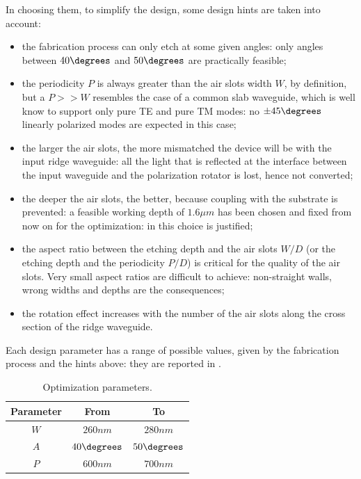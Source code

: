 In choosing them, to simplify the design, some design hints are taken
into account:
\begin{itemize}
\item
  the fabrication process can only etch at some given angles: only
  angles between $40\degrees$ and $50\degrees$ are practically
  feasible;
\item
  the periodicity $P$ is always greater than the air slots width $W$,
  by definition, but a $P >> W$ resembles the case of a common slab
  waveguide, which is well know to support only pure TE and pure TM
  modes: no $\pm45\degrees$ linearly polarized modes are expected in
  this case;
\item
  the larger the air slots, the more mismatched the device will be
  with the input ridge waveguide: all the light that is reflected at
  the interface between the input waveguide and the polarization
  rotator is lost, hence not converted;
\item
  the deeper the air slots, the better, because coupling with the
  substrate is prevented: a feasible working depth of $1.6 \mu m$ has
  been chosen and fixed from now on for the optimization: in
   this choice is justified;
\item
  the aspect ratio between the etching depth and the air slots $W/D$
  (or the etching depth and the periodicity $P/D$) is critical for the
  quality of the air slots. Very small aspect ratios are difficult to
  achieve: non-straight walls, wrong widths and depths are the
  consequences;
\item
  the rotation effect increases with the number of the air slots along
  the cross section of the ridge waveguide.
\end{itemize}

Each design parameter has a range of possible values, given by the
fabrication process and the hints above: they are reported in
. 

\begin{table}[htbp]
  \begin{center}
    \begin{tabular}{ccc}
      \hline
      Parameter & From & To \\
      \hline
      $W$ & $260 nm$ & $280 nm$ \\
      $A$ & $40 \degrees$ & $50 \degrees$ \\
      $P$ & $600 nm$ & $700 nm$ \\      
      \hline
    \end{tabular}
  \end{center}
  \caption{Optimization parameters.}
  \label{tab:polrot_parameters}
\end{table}

